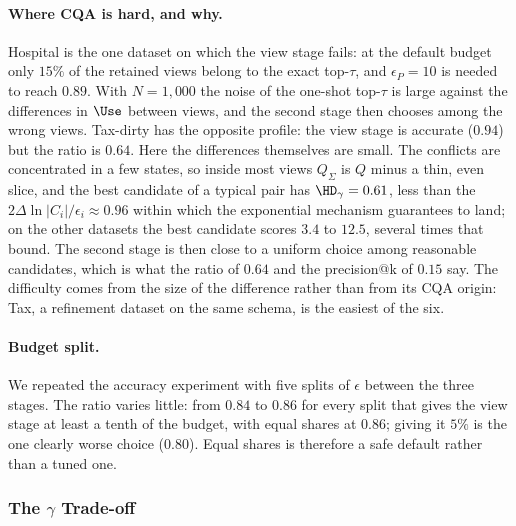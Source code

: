 \paragraph{Where CQA is hard, and why.}
Hospital is the one dataset on which the view stage fails: at the default budget only $15\%$ of the retained views belong to the exact top-$\tau$, and $\epsilon_P=10$ is needed to reach $0.89$.
With $N=1{,}000$ the noise of the one-shot top-$\tau$ is large against the differences in $\Use$ between views, and the second stage then chooses among the wrong views.
Tax-dirty has the opposite profile: the view stage is accurate ($0.94$) but the ratio is $0.64$.
Here the differences themselves are small.
The conflicts are concentrated in a few states, so inside most views $Q_\Sigma$ is $Q$ minus a thin, even slice, and the best candidate of a typical pair has $\HD_\gamma=0.61$, less than the $2\Delta\ln|C_i|/\epsilon_i\approx0.96$ within which the exponential mechanism guarantees to land; on the other datasets the best candidate scores $3.4$ to $12.5$, several times that bound.
The second stage is then close to a uniform choice among reasonable candidates, which is what the ratio of $0.64$ and the precision@k of $0.15$ say.
The difficulty comes from the size of the difference rather than from its CQA origin: Tax, a refinement dataset on the same schema, is the easiest of the six.

\paragraph{Budget split.}
We repeated the accuracy experiment with five splits of $\epsilon$ between the three stages.
The ratio varies little: from $0.84$ to $0.86$ for every split that gives the view stage at least a tenth of the budget, with equal shares at $0.86$; giving it $5\%$ is the one clearly worse choice ($0.80$).
Equal shares is therefore a safe default rather than a tuned one.

\subsubsection{The $\gamma$ Trade-off}
\label{subsec:gamma-tradeoff}

